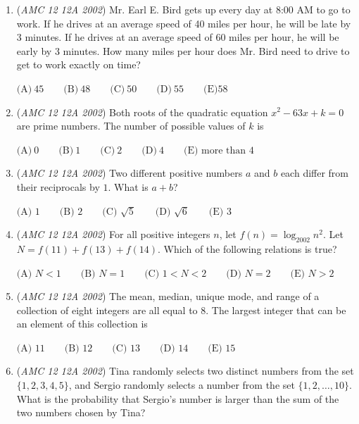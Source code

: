 \begin{enumerate}
 $\mathrm{(A) \ } \frac{1}{4}\qquad \mathrm{(B) \ } \frac13\qquad \mathrm{(C) \ } \frac38\qquad \mathrm{(D) \ } \frac25\qquad \mathrm{(E) \ } \frac12$


	\item (\textit{AMC 12 12A 2002}) Mr. Earl E. Bird gets up every day at 8:00 AM to go to work. If he drives at an average speed of 40 miles per hour, he will be late by 3 minutes. If he drives at an average speed of 60 miles per hour, he will be early by 3 minutes. How many miles per hour does Mr. Bird need to drive to get to work exactly on time?


 $\text{(A)}\ 45 \qquad \text{(B)}\ 48 \qquad \text{(C)}\ 50 \qquad \text{(D)}\ 55 \qquad \text{(E)} 58$


	\item (\textit{AMC 12 12A 2002}) Both roots of the quadratic equation $x^2 - 63x + k = 0$ are prime numbers. The number of possible values of $k$ is 


 $\text{(A)}\ 0 \qquad \text{(B)}\ 1 \qquad \text{(C)}\ 2 \qquad \text{(D)}\ 4 \qquad \text{(E) more than 4}$


	\item (\textit{AMC 12 12A 2002}) Two different positive numbers $a$ and $b$ each differ from their reciprocals by $1$. What is $a+b$?


 $\text{(A) }1 \qquad \text{(B) }2 \qquad \text{(C) }\sqrt 5 \qquad \text{(D) }\sqrt 6 \qquad \text{(E) }3$


	\item (\textit{AMC 12 12A 2002}) For all positive integers $n$, let $f(n)=\log_{2002} n^2$. Let $N=f(11)+f(13)+f(14)$. Which of the following relations is true?


 $\text{(A) }N<1 \qquad \text{(B) }N=1 \qquad \text{(C) }1<N<2 \qquad \text{(D) }N=2 \qquad \text{(E) }N>2$


	\item (\textit{AMC 12 12A 2002}) The mean, median, unique mode, and range of a collection of eight integers are all equal to 8. The largest integer that can be an element of this collection is 


 $\text{(A) }11 \qquad \text{(B) }12 \qquad \text{(C) }13 \qquad \text{(D) }14 \qquad \text{(E) }15$


	\item (\textit{AMC 12 12A 2002}) Tina randomly selects two distinct numbers from the set $\{1, 2, 3, 4, 5\}$, and Sergio randomly selects a number from the set $\{1, 2, \ldots, 10\}$. What is the probability that Sergio's number is larger than the sum of the two numbers chosen by Tina? 



\end{enumerate}

